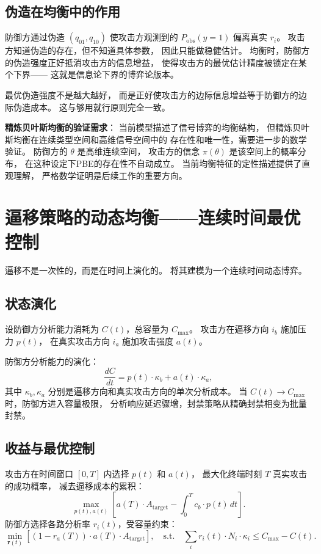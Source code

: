\documentclass[11pt,a4paper]{article}
\begin{document}
\subsection{伪造在均衡中的作用}

防御方通过伪造 \((q_{01}, q_{10})\) 使攻击方观测到的
\(P_{\text{obs}}(y=1)\) 偏离真实 \(r_i\)。
攻击方知道伪造的存在，但不知道具体参数，
因此只能做稳健估计。
均衡时，防御方的伪造强度正好抵消攻击方的信息增益，
使得攻击方的最优估计精度被锁定在某个下界——
这就是信息论下界的博弈论版本。

最优伪造强度不是越大越好，
而是正好使攻击方的边际信息增益等于防御方的边际伪造成本。
这与够用就行原则完全一致。

\textbf{精炼贝叶斯均衡的验证需求}：
当前模型描述了信号博弈的均衡结构，
但精炼贝叶斯均衡在连续类型空间和高维信号空间中的
存在性和唯一性，需要进一步的数学验证。
防御方的 \(\theta\) 是高维连续空间，
攻击方的信念 \(\pi(\theta)\) 是该空间上的概率分布，
在这种设定下PBE的存在性不自动成立。
当前均衡特征的定性描述提供了直观理解，
严格数学证明是后续工作的重要方向。

\section{逼移策略的动态均衡——连续时间最优控制}

逼移不是一次性的，而是在时间上演化的。
将其建模为一个连续时间动态博弈。

\subsection{状态演化}

设防御方分析能力消耗为 \(C(t)\)，总容量为 \(C_{\max}\)。
攻击方在逼移方向 \(i_b\) 施加压力 \(p(t)\)，
在真实攻击方向 \(i_a\) 施加攻击强度 \(a(t)\)。

防御方分析能力的演化：
\[
\frac{dC}{dt} = p(t) \cdot \kappa_b + a(t) \cdot \kappa_a,
\]
其中 \(\kappa_b, \kappa_a\) 分别是逼移方向和真实攻击方向的单次分析成本。
当 \(C(t) \to C_{\max}\) 时，防御方进入容量极限，
分析响应延迟骤增，封禁策略从精确封禁相变为批量封禁。

\subsection{收益与最优控制}

攻击方在时间窗口 \([0, T]\) 内选择 \(p(t)\) 和 \(a(t)\)，
最大化终端时刻 \(T\) 真实攻击的成功概率，
减去逼移成本的累积：
\[
\max_{p(t), a(t)} \left[ a(T) \cdot A_{\text{target}} - \int_0^T c_b \cdot p(t)\,dt \right].
\]
防御方选择各路分析率 \(r_i(t)\)，受容量约束：
\[
\min_{\mathbf{r}(t)} \left[ (1 - r_a(T)) \cdot a(T) \cdot A_{\text{target}} \right],
\quad \text{s.t.} \quad \sum_i r_i(t) \cdot N_i \cdot \kappa_i \le C_{\max} - C(t).
\]
\end{document}
